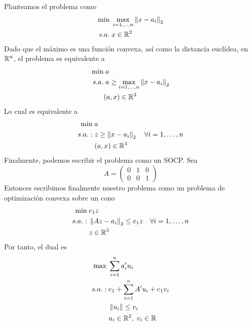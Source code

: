 \documentclass[twoside]{article}
\begin{document}
\begin{solucion}
Planteamos el problema como
\begin{align*}
\min &\; \max_{i=1,\dotsc,n}\left\lVert x-a_i\right\rVert_2\\
s.a.&\; x \in \mathbb{R}^2
\end{align*}
Dado que el máximo es una función convexa, así como la distancia euclídea, en $\mathbb{R}^n$, el problema es equivalente a 
\begin{align*}
\min &\; a\\
s.a.& \;a\geq \max_{i=1,\dotsc,n}\left\lVert x-a_i\right\rVert_2\\
&(a,x)\in \mathbb{R}^3
\end{align*}
Lo cual es equivalente a
\begin{align*}
\min &\; a\\
s.a.:& \;z\geq \left\lVert x-a_i\right\rVert_2 \quad \forall i = 1,\dotsc,n\\
&\;(a,x)\in \mathbb{R}^3
\end{align*}
Finalmente, podemos escribir el problema como un SOCP. Sea 
$$
A=\begin{pmatrix}
0 & 1 & 0\\
0 & 0 & 1
\end{pmatrix}
$$
Entonces escribimos finalmente nuestro problema como un problema de optimización convexa sobre un cono
\begin{align*}
\min &\; e_1 z \\
s.a.:& \; \left\lVert Az-a_i\right\rVert_2\leq e_1 z \quad \forall i = 1,\dotsc,n\\
&\;z\in \mathbb{R}^3
\end{align*}
Por tanto, el dual es
\begin{align*}
\max &\; \sum_{i=1}^n a_i'u_i  \\
s.a.:& \; e_1 + \sum_{i=1}^n A'u_i + e_1 v_i\\
&\;\left\lVert u_i\right\rVert\leq v_i\\
&\;u_i\in \mathbb{R}^2,\; v_i \in \mathbb{R}
\end{align*}
\end{solucion}
\end{document}
